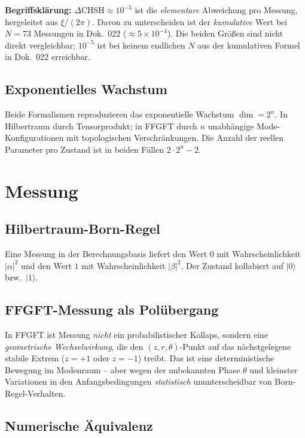 \textbf{Begriffsklärung:} $\Delta\text{CHSH} \approx 10^{-5}$ ist die
\emph{elementare} Abweichung pro Messung, hergeleitet aus $\xi/(2\pi)$.
Davon zu unterscheiden ist der \emph{kumulative} Wert bei $N = 73$
Messungen in Dok.~022 ($\approx 5 \times 10^{-4}$). Die beiden Größen
sind nicht direkt vergleichbar; $10^{-5}$ ist bei keinem endlichen $N$
aus der kumulativen Formel in Dok.~022 erreichbar.

\subsection{Exponentielles Wachstum}

Beide Formalismen reproduzieren das exponentielle Wachstum
$\dim = 2^n$. In Hilbertraum durch Tensorprodukt; in FFGFT durch
$n$ unabhängige Mode-Konfigurationen mit topologischen Verschränkungen.
Die Anzahl der reellen Parameter pro Zustand ist in beiden Fällen
$2 \cdot 2^n - 2$.

\section{Messung}

\subsection{Hilbertraum-Born-Regel}

Eine Messung in der Berechnungsbasis liefert den Wert $0$ mit
Wahrscheinlichkeit $|\alpha|^2$ und den Wert $1$ mit
Wahrscheinlichkeit $|\beta|^2$. Der Zustand kollabiert auf
$|0\rangle$ bzw.\ $|1\rangle$.

\subsection{FFGFT-Messung als Polübergang}

In FFGFT ist Messung \emph{nicht} ein probabilistischer Kollaps,
sondern eine \emph{geometrische Wechselwirkung}, die den
$(z, r, \theta)$-Punkt auf das nächstgelegene stabile Extrem
($z = +1$ oder $z = -1$) treibt. Das ist eine deterministische
Bewegung im Modenraum -- aber wegen der unbekannten Phase $\theta$
und kleinster Variationen in den Anfangsbedingungen
\emph{statistisch} ununterscheidbar von Born-Regel-Verhalten.

\subsection{Numerische Äquivalenz}

